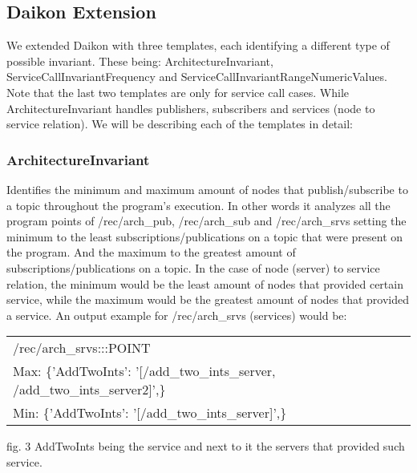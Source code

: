\documentclass[10pt, conference]{IEEEtran}
\begin{document}
\subsection{Daikon Extension}
\normalsize
We extended Daikon with three templates, each identifying a different type of possible invariant. These being: ArchitectureInvariant, ServiceCallInvariantFrequency and ServiceCallInvariantRangeNumericValues. Note that the last two templates are only for service call cases. While ArchitectureInvariant handles publishers, subscribers and services (node to service relation). We will be describing each of the templates in detail:  
\subsubsection{ArchitectureInvariant}
Identifies the minimum and maximum amount of nodes that publish/subscribe to a topic throughout the program's execution. In other words it analyzes all the program points of /rec/arch\_pub, /rec/arch\_sub and /rec/arch\_srvs setting the minimum to the least subscriptions/publications on a topic that were present on the program. And the maximum to the greatest amount of subscriptions/publications on a topic. In the case of node (server) to service relation, the minimum would be the least amount of nodes that provided certain service, while the maximum would be the greatest amount of nodes that provided a service.  An output example for /rec/arch\_srvs (services) would be:

\begin{table}[h!]
 \begin{tabular}{l c} 
/rec/arch\_srvs:::POINT \\
Max: \{'AddTwoInts': '[/add\_two\_ints\_server, /add\_two\_ints\_server2]',\} \\
Min: \{'AddTwoInts': '[/add\_two\_ints\_server­]',\} \\ [1ex] 
 \end{tabular}
 \begin{tablenotes}
	\scriptsize
      \item fig. 3 AddTwoInts being the service and next to it the servers that provided such service. 
    \end{tablenotes}
\end{table}

\normalsize
\end{document}
